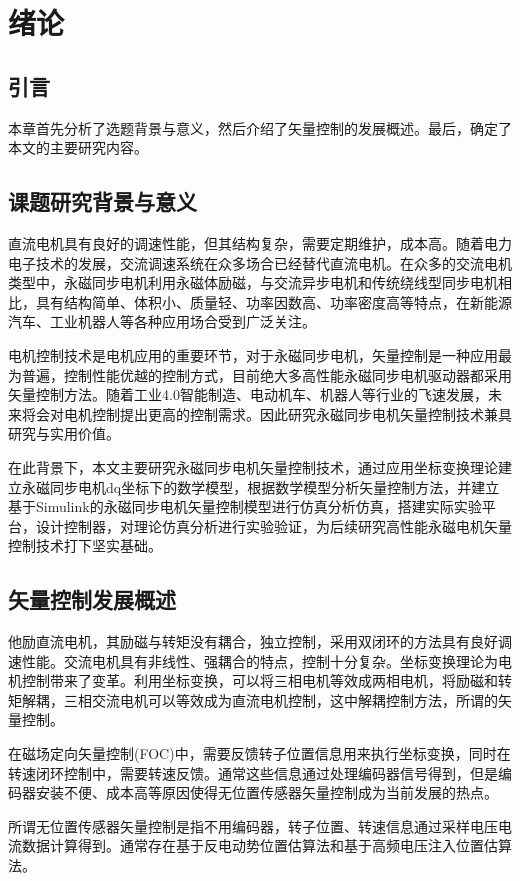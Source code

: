\chapter{绪论}\label{ch:intr}
\section{引言}
本章首先分析了选题背景与意义，然后介绍了矢量控制的发展概述。最后，确定了本文的主要研究内容。
\section{课题研究背景与意义}
直流电机具有良好的调速性能，但其结构复杂，需要定期维护，成本高。随着电力电子技术的发展，交流调速系统在众多场合已经替代直流电机。在众多的交流电机类型中，永磁同步电机利用永磁体励磁，与交流异步电机和传统绕线型同步电机相比，具有结构简单、体积小、质量轻、功率因数高、功率密度高等特点，在新能源汽车、工业机器人等各种应用场合受到广泛关注\cite{dai_development_2007,msaddek_design_2015}。

电机控制技术是电机应用的重要环节，对于永磁同步电机，矢量控制是一种应用最为普遍，控制性能优越的控制方式，目前绝大多高性能永磁同步电机驱动器都采用矢量控制方法。随着工业4.0智能制造、电动机车、机器人等行业的飞速发展，未来将会对电机控制提出更高的控制需求。因此研究永磁同步电机矢量控制技术兼具研究与实用价值。

在此背景下，本文主要研究永磁同步电机矢量控制技术，通过应用坐标变换理论建立永磁同步电机dq坐标下的数学模型，根据数学模型分析矢量控制方法，并建立基于Simulink的永磁同步电机矢量控制模型进行仿真分析仿真，搭建实际实验平台，设计控制器，对理论仿真分析进行实验验证，为后续研究高性能永磁电机矢量控制技术打下坚实基础。
\section{矢量控制发展概述}
他励直流电机，其励磁与转矩没有耦合，独立控制，采用双闭环的方法具有良好调速性能\cite{hughes2013electric}。交流电机具有非线性、强耦合的特点，控制十分复杂。坐标变换理论为电机控制带来了变革。利用坐标变换，可以将三相电机等效成两相电机，将励磁和转矩解耦，三相交流电机可以等效成为直流电机控制，这中解耦控制方法，所谓的矢量控制\cite{book1,vas1990vector,boldea2008active}。

在磁场定向矢量控制(FOC)中，需要反馈转子位置信息用来执行坐标变换，同时在转速闭环控制中，需要转速反馈。通常这些信息通过处理编码器信号得到，但是编码器安装不便、成本高等原因使得无位置传感器矢量控制成为当前发展的热点\cite{review}。

所谓无位置传感器矢量控制是指不用编码器，转子位置、转速信息通过采样电压电流数据计算得到。通常存在基于反电动势位置估算法和基于高频电压注入位置估算法\cite{xie2015design}。

